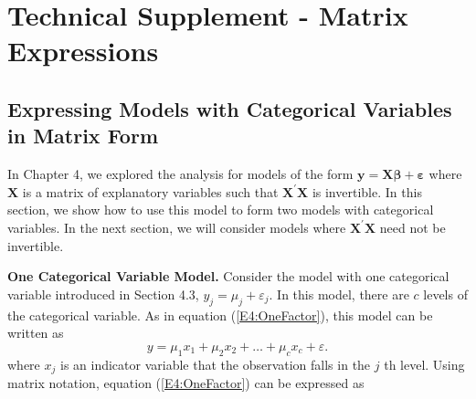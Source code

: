 
\section{Technical Supplement - Matrix Expressions}

\subsection{Expressing Models with Categorical Variables in
Matrix Form}

In Chapter 4, we explored the analysis for models of the form
$\mathbf{y=X}  \boldsymbol \beta + \boldsymbol \varepsilon$ where
$\mathbf{X}$ is a matrix of explanatory variables such that
$\mathbf{X}^{\prime }\mathbf{X}$ is invertible. In this section, we
show how to use this model to form two models with categorical
variables. In the next section, we will consider models where
$\mathbf{X}^{\prime }\mathbf{X}$ need not be invertible.

\textbf{One Categorical Variable Model.} Consider the model with one
categorical variable introduced in Section 4.3, $y_{j}=\mu_{j} +
\varepsilon_{j}.$ In this model, there are $c$ levels of the
categorical variable. As in equation (\ref{E4:OneFactor}), this
model can be written as
\begin{equation*}
y=\mu _{1}x_{1}+\mu _{2}x_{2}+\ldots +\mu _{c}x_{c}+\varepsilon.
\end{equation*}
where $x_{j}$ is an indicator variable that the observation falls in the $j$%
th level. Using matrix notation, equation (\ref{E4:OneFactor}) can
be expressed as

